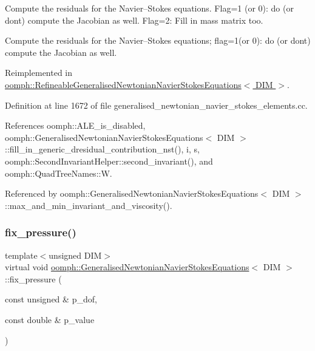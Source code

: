 Compute the residuals for the Navier--Stokes equations. Flag=1 (or 0)\+: do (or don\textquotesingle{}t) compute the Jacobian as well. Flag=2\+: Fill in mass matrix too. 

Compute the residuals for the Navier--Stokes equations; flag=1(or 0)\+: do (or don\textquotesingle{}t) compute the Jacobian as well. 

Reimplemented in \hyperlink{classoomph_1_1RefineableGeneralisedNewtonianNavierStokesEquations_abb7fde3310709225b8f9fbedfb7eca58}{oomph\+::\+Refineable\+Generalised\+Newtonian\+Navier\+Stokes\+Equations$<$ D\+I\+M $>$}.



Definition at line 1672 of file generalised\+\_\+newtonian\+\_\+navier\+\_\+stokes\+\_\+elements.\+cc.



References oomph\+::\+A\+L\+E\+\_\+is\+\_\+disabled, oomph\+::\+Generalised\+Newtonian\+Navier\+Stokes\+Equations$<$ D\+I\+M $>$\+::fill\+\_\+in\+\_\+generic\+\_\+dresidual\+\_\+contribution\+\_\+nst(), i, s, oomph\+::\+Second\+Invariant\+Helper\+::second\+\_\+invariant(), and oomph\+::\+Quad\+Tree\+Names\+::W.



Referenced by oomph\+::\+Generalised\+Newtonian\+Navier\+Stokes\+Equations$<$ D\+I\+M $>$\+::max\+\_\+and\+\_\+min\+\_\+invariant\+\_\+and\+\_\+viscosity().

\mbox{\label{classoomph_1_1GeneralisedNewtonianNavierStokesEquations_a1a39938f37a0a61229e273ea541d5437}} 
\subsubsection{\texorpdfstring{fix\+\_\+pressure()}{fix\_pressure()}}
{\footnotesize\ttfamily template$<$unsigned D\+IM$>$ \\
virtual void \hyperlink{classoomph_1_1GeneralisedNewtonianNavierStokesEquations}{oomph\+::\+Generalised\+Newtonian\+Navier\+Stokes\+Equations}$<$ D\+IM $>$\+::fix\+\_\+pressure (\begin{DoxyParamCaption}\item[{const unsigned \&}]{p\+\_\+dof,  }\item[{const double \&}]{p\+\_\+value }\end{DoxyParamCaption})\hspace{0.3cm}{\ttfamily [pure virtual]}}




